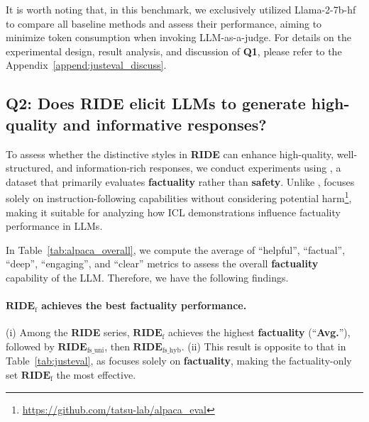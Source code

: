 It is worth noting that, in this benchmark, we exclusively utilized Llama-2-7b-hf to compare all baseline methods and assess their performance, aiming to minimize token consumption when invoking LLM-as-a-judge.
For details on the experimental design, result analysis, and discussion of \textbf{Q1}, please refer to the Appendix~\ref{append:justeval_discuss}.

\subsection{Q2: Does \textbf{RIDE} elicit LLMs to generate high-quality and informative responses?}
\label{ssec:exp_alpaca}



To assess whether the distinctive styles in \textbf{RIDE} can enhance high-quality, well-structured, and information-rich responses, we conduct experiments using \alpaca{}, a dataset that primarily evaluates \textbf{\color{myblue} factuality} rather than \textbf{\color{myred} safety}. Unlike \dataname{}, \alpaca{} focuses solely on instruction-following capabilities without considering potential harm\footnote{\url{https://github.com/tatsu-lab/alpaca_eval}}, making it suitable for analyzing how ICL demonstrations influence factuality performance in LLMs.

In Table~\ref{tab:alpaca_overall}, we compute the average of ``helpful'', ``factual'', ``deep'', ``engaging'', and ``clear'' metrics to assess the overall \textbf{\color{myblue} factuality} capability of the LLM.
Therefore, we have the following findings.

\paragraph{$\textbf{RIDE}_{\text{f}}$ achieves the best factuality performance.} (i) Among the \textbf{RIDE} series, $\textbf{RIDE}_{\text{f}}$ achieves the highest \textbf{\color{myblue} factuality} (``\textbf{Avg.}''), followed by $\textbf{RIDE}_{\text{fs\_uni}}$, then $\textbf{RIDE}_{\text{fs\_hyb}}$. (ii) This result is opposite to that in Table~\ref{tab:justeval}, as \alpaca{} focuses solely on \textbf{\color{myblue} factuality}, making the factuality-only set $\textbf{RIDE}_{\text{f}}$ the most effective.

